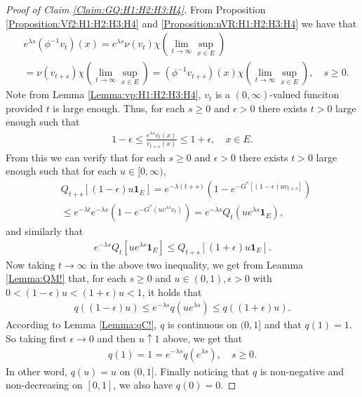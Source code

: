 \documentclass[12pt,a4paper]{amsart}
\numberwithin{equation}{section}
\theoremstyle{plain}
\theoremstyle{definition}
\theoremstyle{remark}
\begin{document}
\begin{proof}[Proof of Claim \ref{Claim:GQ:H1:H2:H3:H4}]
From Proposition \ref{Proposition:Vf2:H1:H2:H3:H4} and \ref{Proposition:nVR:H1:H2:H3:H4} we have that
\begin{align}
& e^{\lambda s}(\phi^{-1}v_t)(x) 
= e^{\lambda s}\nu(v_{t})\chi(\lim_{t\to \infty}\sup_{x\in E}) 
\\&=\nu(v_{t+s}) \chi(\lim_{t\to \infty}\sup_{x\in E}) 
= (\phi^{-1}v_{t+s})(x) \chi(\lim_{t\to \infty} \sup_{x\in E}), 
\quad s\geq 0. \end{align}
Note from Lemma \ref{Lemma:vp:H1:H2:H3:H4}, $v_t$ is a $(0,\infty)$-valued funciton provided $t$ is large enough. 
Thus, for each $s\geq 0$ and $\epsilon >0$ there exists $t>0$ large enough such that
\begin{align} 
1-\epsilon
\leq \frac{e^{\lambda s}v_t(x)}{v_{t+s}(x)} 
\leq 1+\epsilon,
\quad x\in E. 
\end{align}
From this we can verify that for each $s\geq 0$ and $\epsilon >0$ there exists $t>0$ large enough such that for each $u \in [0,\infty)$,
\begin{align} 
& Q_{t+s}[ (1-\epsilon)u\mathbf 1_E ] 
= e^{-\lambda(t+s)}( 1-e^{-G^*[(1-\epsilon)uv_{t+s}]} ) 
\\ & \leq e^{-\lambda t} e^{-\lambda s}( 1- e^{-G^*(ue^{\lambda s}v_t)} )
= e^{-\lambda s}Q_t(ue^{\lambda s} \mathbf 1_E), 
\end{align}
and similarly that
\begin{align} e^{-\lambda s}Q_t[ue^{\lambda s}\mathbf 1_E]  \leq Q_{t+s}[(1+\epsilon)u\mathbf 1_E]. \end{align}
Now taking $t\to \infty$ in the above two inequality, we get from Leamma \ref{Lemma:QM!} that, for each $s\geq 0$ and $u\in (0,1), \epsilon > 0$ with $0 < (1 - \epsilon) u < (1+\epsilon)u < 1$, it holds that
\begin{align} 
q((1-\epsilon)u)
\leq e^{-\lambda s}q(u e^{\lambda s}) 
\leq q((1+\epsilon)u). 
\end{align}
According to Lemma \ref{Lemma:qC!}, $q$ is continuous on $(0,1]$ and that $q(1)= 1$.
So taking first $\epsilon \to 0$ and then $u \uparrow 1$ above, we get that 
\begin{align} 
q(1) 
=1
= e^{- \lambda s} q(e^{\lambda s}), 
\quad s \geq 0. 
\end{align} 
In other word, $q(u) = u$ on $(0,1]$.
Finally noticing that $q$ is non-negative and non-decreasing on $[0,1]$, we also have $q(0) = 0$.
\end{proof}
\end{document}
